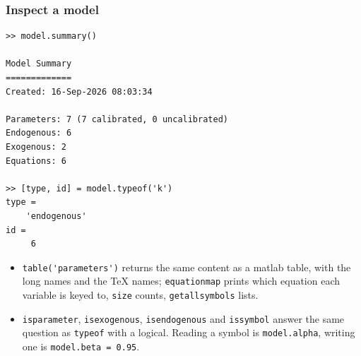 \documentclass[10pt,slidestop]{beamer}
\theoremstyle{plain}
\begin{document}

\begin{frame}[c,fragile]
  \frametitle{Inspect a model}

  \begin{lstlisting}[style=MatlabConsole,basicstyle=\ttfamily\scriptsize]
>> model.summary()

Model Summary
=============
Created: 16-Sep-2026 08:03:34

Parameters: 7 (7 calibrated, 0 uncalibrated)
Endogenous: 6
Exogenous: 2
Equations: 6

>> [type, id] = model.typeof('k')
type =
    'endogenous'
id =
     6
  \end{lstlisting}

  \begin{itemize}\small
  \item \verb+table('parameters')+ returns the same content as a matlab table, with the
    long names and the \TeX{} names; \verb+equationmap+ prints which equation each variable
    is keyed to, \verb+size+ counts, \verb+getallsymbols+ lists.
  \item \verb+isparameter+, \verb+isexogenous+, \verb+isendogenous+ and \verb+issymbol+
    answer the same question as \verb+typeof+ with a logical. Reading a symbol is
    \verb+model.alpha+, writing one is \verb+model.beta = 0.95+.
  \end{itemize}

\end{frame}
\end{document}
